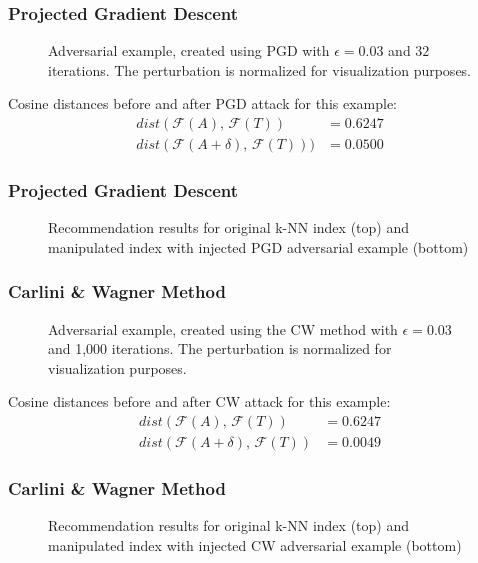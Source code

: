 \documentclass{beamer}
\begin{document}
	
	
	\begin{frame}
		\frametitle{Projected Gradient Descent}
		\begin{figure}[H]
			\centering
			\resizebox{\textwidth}{!}{}
			\caption{Adversarial example, created using PGD with $\epsilon = 0.03$ and $32$ iterations. The perturbation is normalized for visualization purposes.}
			\label{fig:pgd-example}
		\end{figure}
		Cosine distances before and after PGD attack for this example:
		\begin{align}
		dist(\mathcal{F}(A),\,\mathcal{F}(T)) &= 0.6247 \\
		dist(\mathcal{F}(A + \delta),\,\mathcal{F}(T))) &= 0.0500
		\end{align}
	\end{frame}
	
	\begin{frame}
		\frametitle{Projected Gradient Descent}
		\begin{figure}[H]
			\centering
			\resizebox{\textwidth}{!}{}
			\caption{Recommendation results for original k-NN index (top) and manipulated index with injected PGD adversarial example (bottom)}
			\label{fig:pgd-reco}
		\end{figure}
	\end{frame}
	
	
	\begin{frame}
		\frametitle{Carlini \& Wagner Method}
		\begin{figure}[H]
			\centering
			\resizebox{\textwidth}{!}{}
			\caption{Adversarial example, created using the CW method with $\epsilon = 0.03$ and 1,000 iterations. The perturbation is normalized for visualization purposes.}
			\label{fig:cw-example}
		\end{figure}
		Cosine distances before and after CW attack for this example:
		\begin{align}
		dist(\mathcal{F}(A),\,\mathcal{F}(T)) &= 0.6247 \\
		dist(\mathcal{F}(A + \delta),\,\mathcal{F}(T)) &= 0.0049
		\end{align}
	\end{frame}
	
	\begin{frame}
		\frametitle{Carlini \& Wagner Method}
		\begin{figure}[H]
			\centering
			\resizebox{\textwidth}{!}{}
			\caption{Recommendation results for original k-NN index (top) and manipulated index with injected CW adversarial example (bottom)}
			\label{fig:cw-reco}
		\end{figure}
	\end{frame}
	
\end{document}
